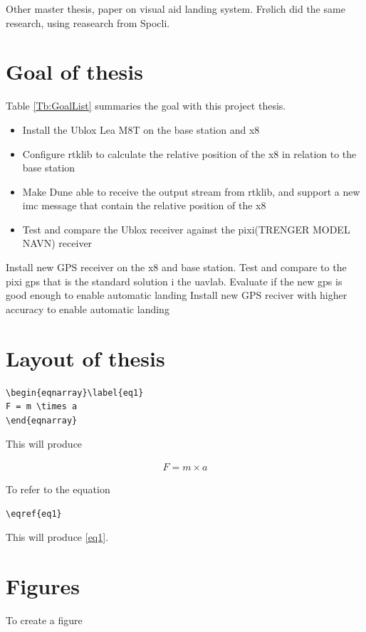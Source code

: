 Other master thesis, paper on visual aid landing system. Frølich did the same research, using reasearch from Spocli.
\section{Goal of thesis}
Table \ref{Tb:GoalList} summaries the goal with this project thesis.
\begin{itemize}\label{Tb:GoalList}
\item Install the Ublox Lea M8T on the base station and x8
\item Configure rtklib to calculate the relative position of the x8 in relation to the base station
\item Make Dune able to receive the output stream from rtklib, and support a new imc message that contain the relative position of the x8
\item Test and compare the Ublox receiver against the pixi(TRENGER MODEL NAVN) receiver
\end{itemize}
Install new GPS receiver on the x8 and base station. Test and compare to the pixi gps that is the standard solution i the uavlab. Evaluate if the new gps is good enough to enable automatic landing
Install new GPS reciver with higher accuracy to enable automatic landing
\section{Layout of thesis}
\begin{verbatim}
\begin{eqnarray}\label{eq1}
F = m \times a
\end{eqnarray}
\end{verbatim}

\noindent This will produce

\begin{eqnarray}\label{eq1}
F = m \times a
\end{eqnarray}

\noindent To refer to the equation

\begin{verbatim}
\eqref{eq1}
\end{verbatim}

\noindent This will produce \eqref{eq1}.


\section{Figures}
To create a figure

